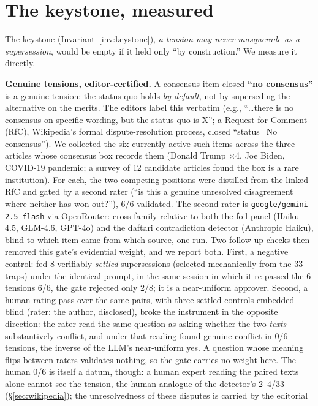 \documentclass[11pt]{article}
\begin{document}
\section{The keystone, measured}
\label{sec:keystone}

The keystone (Invariant~\ref{inv:keystone}), \emph{a tension may never masquerade as a supersession}, would
be empty if it held only ``by construction.'' We measure it directly.

\textbf{Genuine tensions, editor-certified.} A consensus item closed \textbf{``no consensus''} is a
genuine tension: the status quo holds \emph{by default}, not by superseding the alternative on the
merits. The editors label this verbatim (e.g., ``\ldots there is no consensus on specific wording,
but the status quo is X''; a Request for Comment (RfC), Wikipedia's formal
dispute-resolution process, closed ``status=No consensus''). We collected the six
currently-active such items across the three articles whose consensus box records
them (Donald Trump $\times$4, Joe Biden, COVID-19 pandemic; a survey of 12 candidate articles found
the box is a rare institution). For each, the two competing positions were distilled from
the linked RfC and gated by a second rater (``is this a genuine unresolved disagreement where
neither has won out?''), 6/6 validated. The second rater is \texttt{google/gemini-2.5-flash} via
OpenRouter: cross-family relative to both the foil panel (Haiku-4.5, GLM-4.6, GPT-4o) and the
daftari contradiction detector (Anthropic Haiku), blind to which item came from which source,
one run. Two follow-up checks then removed this gate's evidential weight, and we report
both. First, a negative control: fed 8 verifiably \emph{settled} supersessions (selected
mechanically from the 33 traps) under the identical prompt, in the same session in which it
re-passed the 6 tensions 6/6, the gate rejected only 2/8; it is a near-uniform approver.
Second, a human rating pass over the same pairs, with three settled controls embedded
blind (rater: the author, disclosed), broke the instrument in the opposite direction: the
rater read the same question as asking whether the two \emph{texts} substantively conflict, and
under that reading found genuine conflict in 0/6 tensions, the inverse of the LLM's
near-uniform yes. A question whose meaning flips between raters validates nothing, so the
gate carries no weight here. The human 0/6 is itself a datum, though: a human expert
reading the paired texts alone cannot see the tension, the human analogue of the
detector's 2--4/33 (\S\ref{sec:wikipedia}); the unresolvedness of these disputes is carried by the editorial
\end{document}
